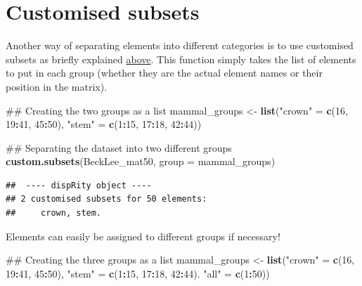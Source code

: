 \documentclass[]{book}
\newenvironment{Shaded}{\begin{snugshade}}{\end{snugshade}}
\newcommand{\KeywordTok}[1]{\textcolor[rgb]{0.13,0.29,0.53}{\textbf{#1}}}
\newcommand{\DataTypeTok}[1]{\textcolor[rgb]{0.13,0.29,0.53}{#1}}
\newcommand{\DecValTok}[1]{\textcolor[rgb]{0.00,0.00,0.81}{#1}}
\newcommand{\StringTok}[1]{\textcolor[rgb]{0.31,0.60,0.02}{#1}}
\newcommand{\OperatorTok}[1]{\textcolor[rgb]{0.81,0.36,0.00}{\textbf{#1}}}
\newcommand{\NormalTok}[1]{#1}
\theoremstyle{definition}
\theoremstyle{definition}
\theoremstyle{remark}
\begin{document}
\hypertarget{customised-subsets}{\section{Customised
subsets}\label{customised-subsets}}

Another way of separating elements into different categories is to use
customised subsets as briefly explained
\protect\hyperlink{disparity-among-groups}{above}. This function simply
takes the list of elements to put in each group (whether they are the
actual element names or their position in the matrix).

\begin{Shaded}
\begin{Highlighting}[]
\NormalTok{## Creating the two groups as a list}
\NormalTok{mammal_groups <-}\StringTok{ }\KeywordTok{list}\NormalTok{(}\StringTok{"crown"}\NormalTok{ =}\StringTok{ }\KeywordTok{c}\NormalTok{(}\DecValTok{16}\NormalTok{, }\DecValTok{19}\OperatorTok{:}\DecValTok{41}\NormalTok{, }\DecValTok{45}\OperatorTok{:}\DecValTok{50}\NormalTok{),}
                      \StringTok{"stem"}\NormalTok{ =}\StringTok{ }\KeywordTok{c}\NormalTok{(}\DecValTok{1}\OperatorTok{:}\DecValTok{15}\NormalTok{, }\DecValTok{17}\OperatorTok{:}\DecValTok{18}\NormalTok{, }\DecValTok{42}\OperatorTok{:}\DecValTok{44}\NormalTok{))}

\NormalTok{## Separating the dataset into two different groups}
\KeywordTok{custom.subsets}\NormalTok{(BeckLee_mat50, }\DataTypeTok{group =}\NormalTok{ mammal_groups)}
\end{Highlighting}
\end{Shaded}

\begin{verbatim}
##  ---- dispRity object ---- 
## 2 customised subsets for 50 elements:
##     crown, stem.
\end{verbatim}

Elements can easily be assigned to different groups if necessary!

\begin{Shaded}
\begin{Highlighting}[]
\NormalTok{## Creating the three groups as a list}
\NormalTok{mammal_groups <-}\StringTok{ }\KeywordTok{list}\NormalTok{(}\StringTok{"crown"}\NormalTok{ =}\StringTok{ }\KeywordTok{c}\NormalTok{(}\DecValTok{16}\NormalTok{, }\DecValTok{19}\OperatorTok{:}\DecValTok{41}\NormalTok{, }\DecValTok{45}\OperatorTok{:}\DecValTok{50}\NormalTok{),}
                      \StringTok{"stem"}\NormalTok{ =}\StringTok{ }\KeywordTok{c}\NormalTok{(}\DecValTok{1}\OperatorTok{:}\DecValTok{15}\NormalTok{, }\DecValTok{17}\OperatorTok{:}\DecValTok{18}\NormalTok{, }\DecValTok{42}\OperatorTok{:}\DecValTok{44}\NormalTok{).}
                      \StringTok{"all"}\NormalTok{ =}\StringTok{ }\KeywordTok{c}\NormalTok{(}\DecValTok{1}\OperatorTok{:}\DecValTok{50}\NormalTok{))}
\end{Highlighting}
\end{Shaded}
\end{document}
